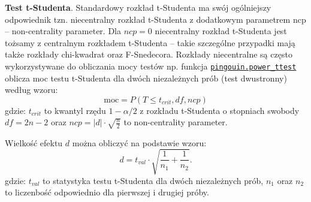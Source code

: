 \documentclass[polish,]{book}
\newenvironment{Shaded}{\begin{snugshade}}{\end{snugshade}}
\newcommand{\BuiltInTok}[1]{#1}
\newcommand{\DecValTok}[1]{\textcolor[rgb]{0.00,0.00,0.81}{#1}}
\newcommand{\FloatTok}[1]{\textcolor[rgb]{0.00,0.00,0.81}{#1}}
\newcommand{\ImportTok}[1]{#1}
\newcommand{\NormalTok}[1]{#1}
\newcommand{\OperatorTok}[1]{\textcolor[rgb]{0.81,0.36,0.00}{\textbf{#1}}}
\newcommand{\SpecialCharTok}[1]{\textcolor[rgb]{0.00,0.00,0.00}{#1}}
\newcommand{\StringTok}[1]{\textcolor[rgb]{0.31,0.60,0.02}{#1}}
\begin{document}
\textbf{Test t-Studenta}. Standardowy rozkład t-Studenta ma swój ogólniejszy odpowiednik tzn. niecentralny rozkład t-Studenta z dodatkowym parametrem ncp -- non-centrality parameter. Dla \(ncp = 0\) niecentralny rozkład t-Studenta jest tożsamy z centralnym rozkładem t-Studenta -- takie szczególne przypadki mają także rozkłady chi-kwadrat oraz F-Snedecora. Rozkłady niecentralne są często wykorzystywane do obliczania mocy testów np. funkcja
\href{https://pingouin-stats.org/generated/pingouin.power_ttest.html\#pingouin.power_ttest}{\texttt{pingouin.power\_ttest}} oblicza moc testu t-Studenta dla dwóch niezależnych prób (test dwustronny) według wzoru:
\begin{equation}
\mbox{moc}=P(T\leq t_{crit},df,ncp)
\label{eq:moc01}
\end{equation}
gdzie: \(t_{crit}\) to kwantyl rzędu \(1-\alpha/2\) z rozkładu t-Studenta o stopniach swobody \(df=2n-2\) oraz \(ncp=|d|\cdot\sqrt{\frac{n}{2}}\) to non-centrality parameter.

Wielkość efektu \(d\) można obliczyć na podstawie wzoru:
\begin{equation}
d=t_{val}\cdot \sqrt{\frac{1}{n_1}+\frac{1}{n_2}}.
\label{eq:moc00}
\end{equation}
gdzie: \(t_{val}\) to statystyka testu t-Studenta dla dwóch niezależnych prób, \(n_1\) oraz \(n_2\) to liczenbość odpowiednio dla pierwszej i drugiej próby.

\begin{Shaded}
\end{Shaded}
\end{document}
